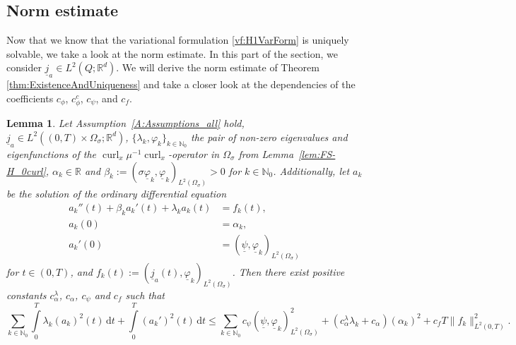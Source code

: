 \documentclass[a4paper,11pt]{article}
\newtheorem{lem}[thm]{Lemma}
\newcommand{\N}{\mathbb N}
\newcommand{\R}{\mathbb R}
\newcommand{\intT}{\int\limits_{0}^T}
\newcommand{\omsig}{\Omega_{\sigma}}
\newcommand{\cu}{\operatorname{curl}}
\renewcommand{\vec}[1]{\underline{#1}}
\begin{document}
\subsection{Norm estimate}
Now that we know that the variational formulation \eqref{vf:H1VarForm} is uniquely solvable, we take a look at the norm estimate. In this part of the section, we consider $\vec j_a\in L^2(Q;\R^d)$. We will derive the norm estimate of Theorem \ref{thm:ExistenceAndUniqueness} and take a closer look at the dependencies of the coefficients  $c_\phi$, $c_\phi^c$, $c_\psi$,  and $c_f$.

\begin{lem}\label{lem:ODE2}
	Let Assumption~\ref{A:Assumptions_all} hold, $\vec j_a\in L^2((0,T) \times \omsig;\R^d)$,  $\{\lambda_k,\varphi_k\} _{k\in \N_0}$ the pair of non-zero eigenvalues and eigenfunctions of the $\cu_x \mu^{-1} \cu_x$-operator in $\omsig$ from Lemma~\ref{lem:FS-H_0curl}, $\alpha_k\in\R$ and 	$\beta_k:= (\sigma \vec \varphi_k,\vec \varphi_k)_{L^2(\omsig)} >0$ for $k \in \N_0$. Additionally, let $ {a_k}$ be the solution of the ordinary differential equation 
	\begin{align}
		\nonumber
		 {a_k}''(t)+ \beta_k  {a_k}'(t)+ \lambda_k  {a_k} (t) &= f_k(t),\\
		\label{eqn:ODE2}
		 {a_k} (0) &=\alpha_k,\\
		\nonumber
		 {a_k}'(0) &= (\vec \psi,\vec \varphi_k)_{L^2(\Omega_\sigma)}	
	\end{align}
	for $t\in (0,T)$, and $f_k(t) := (\vec j_a(t), \vec \varphi_k)_{L^2(\omsig)}$. Then there exist positive constants $c_\alpha^\lambda$, $c_\alpha$, $c_\psi$ and $c_f$ such that
	\[
	\sum_{k\in \N_0}\intT \lambda_k( {a_k})^2(t)\, \mathrm dt +\intT (  {a_k}')^2(t)\,\mathrm dt \leq \sum_{k\in \N_0} c_\psi (\vec \psi,\vec \varphi_k)^2_{L^2(\omsig)}+(c_\alpha^\lambda \lambda_k +c_\alpha ) (\alpha_k)^2 + c_f T\|f_k\|^2_{L^2(0,T)}.
	\]
\end{lem}
\end{document}
